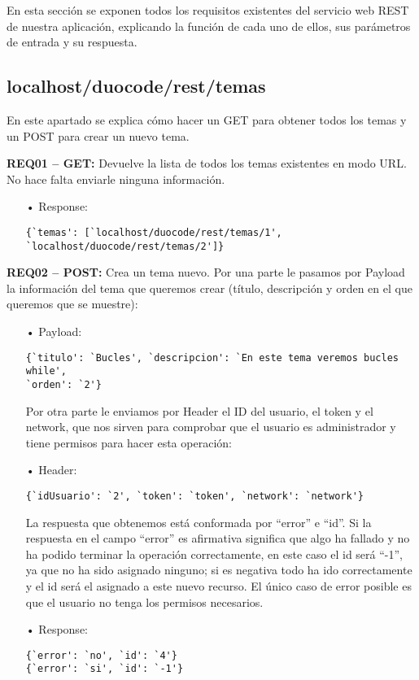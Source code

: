 En esta sección se exponen todos los requisitos existentes del servicio web REST de nuestra aplicación, explicando la función de cada uno de ellos, sus parámetros de entrada y su respuesta.

\subsection{localhost/duocode/rest/temas}
En este apartado se explica cómo hacer un GET para obtener todos los temas y un POST para crear un nuevo tema.
\vspace{1em}

\textbf{REQ01 – GET:} Devuelve la lista de todos los temas existentes en modo URL. No hace falta enviarle ninguna información. 

\begin{itemize}
\item[•] Response:
{\codesize
\begin{verbatim}
{`temas': [`localhost/duocode/rest/temas/1', 
`localhost/duocode/rest/temas/2']}
\end{verbatim}
}
\end{itemize}

\textbf{REQ02 – POST:} Crea un tema nuevo. Por una parte le pasamos por Payload la información del tema que queremos crear (título, descripción y orden en el que queremos que se muestre): 
\begin{itemize}
\item[•]Payload: 
{\codesize
\begin{verbatim}
{`titulo': `Bucles', `descripcion': `En este tema veremos bucles while', 
`orden': `2'} 
\end{verbatim}
}

Por otra parte le enviamos por Header el ID del usuario, el token y el network, que nos sirven para comprobar que el usuario es administrador y tiene permisos para hacer esta operación:
\item[•]Header:
{\codesize
\begin{verbatim}
{`idUsuario': `2', `token': `token', `network': `network'}
\end{verbatim}
}

La respuesta que obtenemos está conformada por ``error'' e ``id''. Si la respuesta en el campo ``error'' es afirmativa significa que algo ha fallado y no ha podido terminar la operación correctamente, en este caso el id será ``-1'', ya que no ha sido asignado ninguno; si es negativa todo ha ido correctamente y el id será el asignado a este nuevo recurso. El único caso de error posible es que el usuario no tenga los permisos necesarios.
\item[•]Response:
{\codesize
\begin{verbatim}
{`error': `no', `id': `4'}
{`error': `si', `id': `-1'}
\end{verbatim}
}
\end{itemize}

